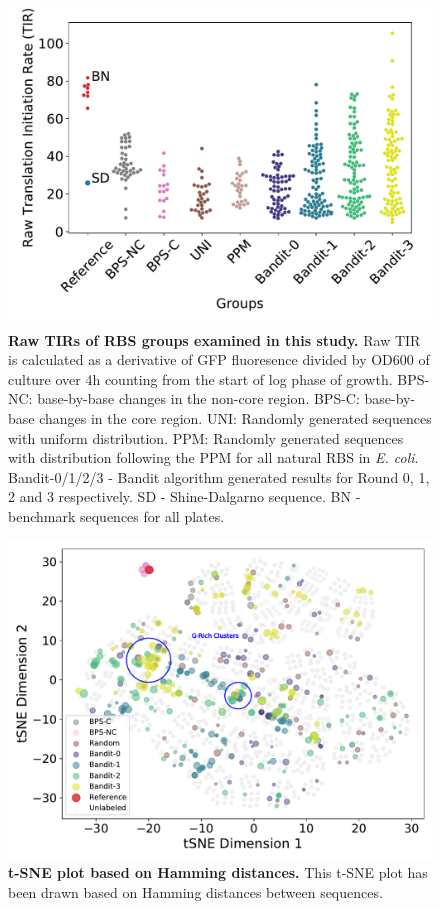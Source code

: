 \begin{figure}[!ht]
    \centering
    \includegraphics[scale = 0.4]{plots/Supplementary/swarmplot_raw.pdf}
    \caption{
    \textbf{Raw TIRs of RBS groups examined in this study.}
    Raw TIR is calculated as a derivative of GFP fluoresence divided by OD600 of culture over 4h counting from the start of log phase of growth. 
    BPS-NC: base-by-base changes in the non-core region. 
    BPS-C: base-by-base changes in the core region. 
    UNI: Randomly generated sequences with uniform distribution. 
    PPM: Randomly generated sequences with distribution following the PPM for all natural RBS in \emph{E. coli}. 
    Bandit-0/1/2/3 - Bandit algorithm generated results for Round 0, 1, 2 and 3 respectively.
    SD - Shine-Dalgarno sequence.
    BN - benchmark sequences for all plates. 
    }
    \label{fig:rawswarmplots.}
\end{figure}

\begin{figure}[!ht]
   \centering
    \includegraphics[scale=0.5]{plots/Supplementary/tsneplot_hamming.pdf}
   \caption{\textbf{t-SNE plot based on Hamming distances.} This t-SNE plot has been drawn based on Hamming distances between sequences. 
    }
   \label{fig: TSNE hamming}
\end{figure}

